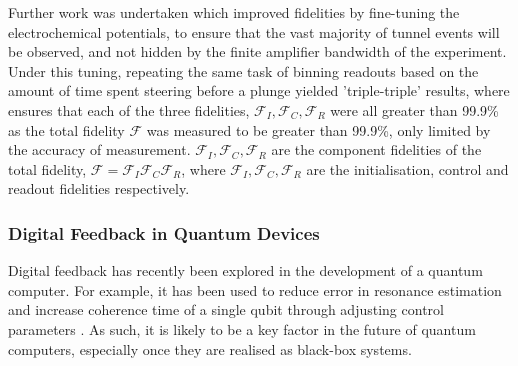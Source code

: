	Further work was undertaken which improved fidelities by fine-tuning the electrochemical potentials, to ensure that the vast majority of tunnel events will be observed, and not hidden by the finite amplifier bandwidth of the experiment. Under this tuning, repeating the same task of binning readouts based on the amount of time spent steering before a plunge yielded 'triple-triple' results, where ensures that each of the three fidelities, $\mathcal{F}_I, \mathcal{F}_C, \mathcal{F}_R$ were all greater than 99.9\% as the total fidelity $\mathcal{F}$ was measured to be greater than 99.9\%, only limited by the accuracy of measurement. $\mathcal{F}_I, \mathcal{F}_C, \mathcal{F}_R$ are the component fidelities of the total fidelity, $\mathcal{F} = \mathcal{F}_I \mathcal{F}_C \mathcal{F}_R$, where $\mathcal{F}_I, \mathcal{F}_C, \mathcal{F}_R$ are the initialisation, control and readout fidelities respectively.

\subsubsection{Digital Feedback in Quantum Devices}

Digital feedback has recently been explored in the development of a quantum computer. For example, it has been used to reduce error in resonance estimation \cite{bonato2015optimized} and increase coherence time of a single qubit through adjusting control parameters \cite{shulman2014suppressing}. As such, it is likely to be a key factor in the future of quantum computers, especially once they are realised as black-box systems.
